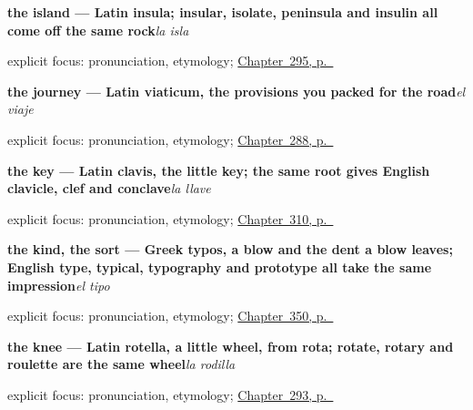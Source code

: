 \noindent\begin{minipage}[t]{\linewidth}
\raggedright
\textbf{the island — Latin insula; insular, isolate, peninsula and insulin all come off the same rock}\enspace\emph{la isla}\par
\footnotesize explicit focus: pronunciation, etymology; \hyperref[ch:el-sendero]{Chapter~295, p.~\pageref*{ch:el-sendero}}
\end{minipage}\par\smallskip

\noindent\begin{minipage}[t]{\linewidth}
\raggedright
\textbf{the journey — Latin viaticum, the provisions you packed for the road}\enspace\emph{el viaje}\par
\footnotesize explicit focus: pronunciation, etymology; \hyperref[ch:la-partida]{Chapter~288, p.~\pageref*{ch:la-partida}}
\end{minipage}\par\smallskip

\noindent\begin{minipage}[t]{\linewidth}
\raggedright
\textbf{the key — Latin clavis, the little key; the same root gives English clavicle, clef and conclave}\enspace\emph{la llave}\par
\footnotesize explicit focus: pronunciation, etymology; \hyperref[ch:el-cuarto-y-la-mesa]{Chapter~310, p.~\pageref*{ch:el-cuarto-y-la-mesa}}
\end{minipage}\par\smallskip

\noindent\begin{minipage}[t]{\linewidth}
\raggedright
\textbf{the kind, the sort — Greek typos, a blow and the dent a blow leaves; English type, typical, typography and prototype all take the same impression}\enspace\emph{el tipo}\par
\footnotesize explicit focus: pronunciation, etymology; \hyperref[ch:propio-y-ajeno]{Chapter~350, p.~\pageref*{ch:propio-y-ajeno}}
\end{minipage}\par\smallskip

\noindent\begin{minipage}[t]{\linewidth}
\raggedright
\textbf{the knee — Latin rotella, a little wheel, from rota; rotate, rotary and roulette are the same wheel}\enspace\emph{la rodilla}\par
\footnotesize explicit focus: pronunciation, etymology; \hyperref[ch:mas-del-cuerpo]{Chapter~293, p.~\pageref*{ch:mas-del-cuerpo}}
\end{minipage}\par\smallskip

